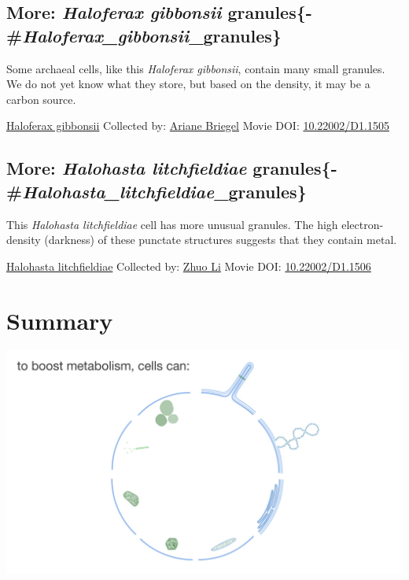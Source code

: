 \documentclass[]{tufte-book}
\begin{document}
\hypertarget{more-haloferax-gibbonsii-granules-haloferax_gibbonsii_granules}{%
\subsection{\texorpdfstring{More: \emph{Haloferax gibbonsii} granules\{-\#\emph{Haloferax\_gibbonsii}\_granules\}}{More: Haloferax gibbonsii granules\{-\#Haloferax\_gibbonsii\_granules\}}}\label{more-haloferax-gibbonsii-granules-haloferax_gibbonsii_granules}}

Some archaeal cells, like this \emph{Haloferax gibbonsii}, contain many small granules. We do not yet know what they store, but based on the density, it may be a carbon source.



\hypertarget{htmlwidget-ec23c30afeb3c98a7a0e}{}

\label{fig:4-10a}\protect\hyperlink{tree}{Haloferax gibbonsii} Collected by: \protect\hyperlink{ariane_briegel}{Ariane Briegel} Movie DOI: \href{https://doi.org/10.22002/D1.1505}{10.22002/D1.1505}

\hypertarget{more-halohasta-litchfieldiae-granules-halohasta_litchfieldiae_granules}{%
\subsection{\texorpdfstring{More: \emph{Halohasta litchfieldiae} granules\{-\#\emph{Halohasta\_litchfieldiae}\_granules\}}{More: Halohasta litchfieldiae granules\{-\#Halohasta\_litchfieldiae\_granules\}}}\label{more-halohasta-litchfieldiae-granules-halohasta_litchfieldiae_granules}}

This \emph{Halohasta litchfieldiae} cell has more unusual granules. The high electron-density (darkness) of these punctate structures suggests that they contain metal.



\hypertarget{htmlwidget-c6b43703f769ad364c43}{}

\label{fig:4-10b}\protect\hyperlink{tree}{Halohasta litchfieldiae} Collected by: \protect\hyperlink{zhuo_li}{Zhuo Li} Movie DOI: \href{https://doi.org/10.22002/D1.1506}{10.22002/D1.1506}

\hypertarget{summary-3}{%
\section{Summary}\label{summary-3}}

\includegraphics{img/summaries/04_Growth}
\end{document}
